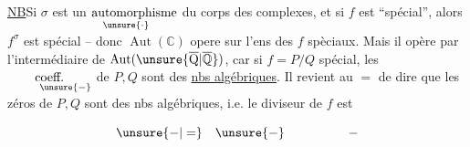 \uline{NB}\quad Si $\sigma$ est un $\underset{\hspace{-1.3em}\unsure{\cdot}}{\text{automorphisme}}$ du corps des complexes, et si $f$ est ``spécial'', alors $f^\sigma$ est  spécial -- donc $\operatorname{Aut}(\mathbb C)$ opere sur l'ens des $f$ spèciaux. Mais il opère par l'intermédiaire de $\operatorname{Aut}(\unsure{\overline{\mathrm Q}|\overline{\mathbb Q}})$, car si $f=P/Q$ spécial, les $\underset{\hspace{2.5em}\unsure{-}}{\text{coeff.}}$ de $P,Q$ sont des \uline{nbs algébriques}. Il revient au $=$ de dire que les zéros de $P,Q$ sont des nbs algébriques, i.e. le diviseur de $f$ est

\[
 \unsure{-|=}\quad\unsure{-}\hspace{5em}-
\]
